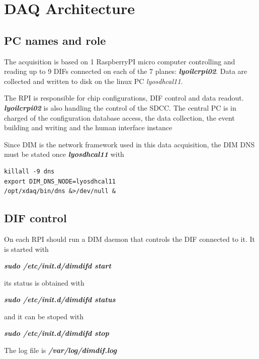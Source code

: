 \documentclass[english]{article}
\begin{document}
\section{DAQ Architecture}

\subsection{PC names and role}
The acquisition is based on 1 RaspberryPI micro computer controlling and reading up to 9 DIFs connected on each of the 7 planes: {\sl \bf lyoilcrpi02}. Data are collected and written to disk on the linux PC {\sl lyosdhcal11}.

The  RPI is responsible for chip configurations, DIF control and data readout. {\sl \bf lyoilcrpi02} is also handling the control of the SDCC. The central PC is in charged of the configuration database access, the data collection, the event building and writing and the human interface instance

Since DIM is the network framework used in this data acquisition, the DIM DNS must be stated once {\sl \bf lyosdhcal11} with
\begin{verbatim}
killall -9 dns
export DIM_DNS_NODE=lyosdhcal11
/opt/xdaq/bin/dns &>/dev/null &
\end{verbatim}

\subsection{DIF control}

On each RPI should run a DIM daemon that controls the DIF connected to it. It is started with

{\sl \bf sudo /etc/init.d/dimdifd start }

its status is obtained with 

{\sl \bf sudo /etc/init.d/dimdifd status }

and it can be stoped with

{\sl \bf sudo /etc/init.d/dimdifd stop }

The log file is {\sl \bf /var/log/dimdif.log }
\end{document}
